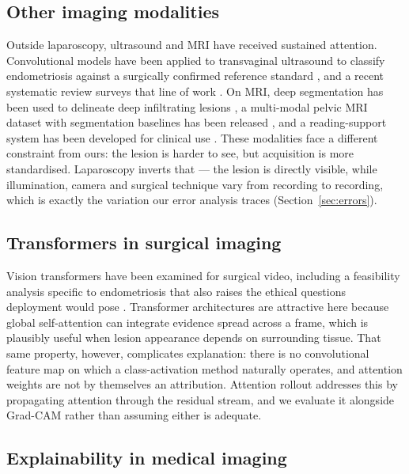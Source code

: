 \documentclass[preprint,12pt]{elsarticle}
\begin{document}
\subsection{Other imaging modalities}

Outside laparoscopy, ultrasound and MRI have received sustained attention. Convolutional models have been applied to transvaginal ultrasound to classify endometriosis against a surgically confirmed reference standard \cite{ref_b1}, and a recent systematic review surveys that line of work \cite{ref_b4}. On MRI, deep segmentation has been used to delineate deep infiltrating lesions \cite{ref_a8}, a multi-modal pelvic MRI dataset with segmentation baselines has been released \cite{ref_c1}, and a reading-support system has been developed for clinical use \cite{ref_c2}. These modalities face a different constraint from ours: the lesion is harder to see, but acquisition is more standardised. Laparoscopy inverts that --- the lesion is directly visible, while illumination, camera and surgical technique vary from recording to recording, which is exactly the variation our error analysis traces (Section~\ref{sec:errors}).

\subsection{Transformers in surgical imaging}

Vision transformers \cite{ref_vit} have been examined for surgical video, including a feasibility analysis specific to endometriosis that also raises the ethical questions deployment would pose \cite{ref_a9}. Transformer architectures are attractive here because global self-attention can integrate evidence spread across a frame, which is plausibly useful when lesion appearance depends on surrounding tissue. That same property, however, complicates explanation: there is no convolutional feature map on which a class-activation method naturally operates, and attention weights are not by themselves an attribution. Attention rollout \cite{ref_rollout} addresses this by propagating attention through the residual stream, and we evaluate it alongside Grad-CAM rather than assuming either is adequate.

\subsection{Explainability in medical imaging}
\end{document}
